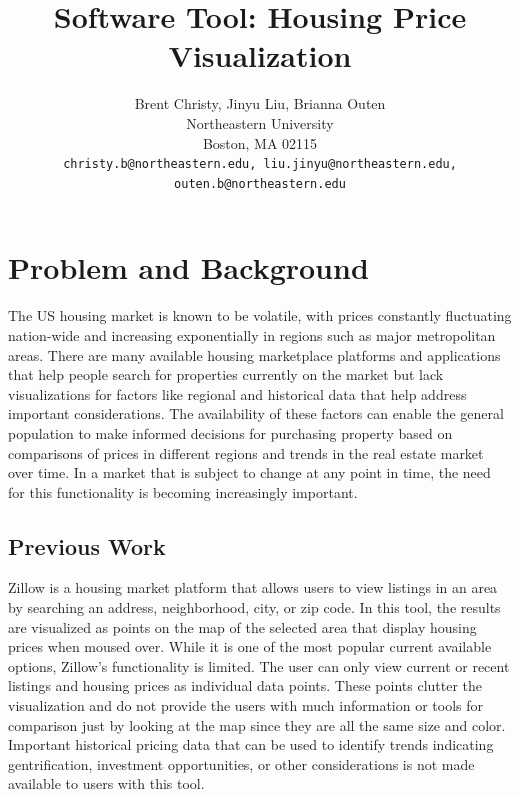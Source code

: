 \documentclass{article}
\title{Software Tool: Housing Price Visualization}
\author{%
  Brent Christy, Jinyu Liu, Brianna Outen \\
  Northeastern University\\
  Boston, MA 02115 \\
  \texttt{christy.b@northeastern.edu, liu.jinyu@northeastern.edu,} \\
  \texttt{outen.b@northeastern.edu} \\
}
\begin{document}
\maketitle

\section{Problem and Background}
The US housing market is known to be volatile, with prices constantly fluctuating nation-wide and increasing exponentially in regions such as major metropolitan
areas. There are many available housing marketplace platforms and applications that help people search for properties currently on the market but lack
visualizations for factors like regional and historical data that help address important considerations. The availability of these factors can enable the general
population to make informed decisions for purchasing property based on comparisons of prices in different regions and trends in the real estate market over time. In a market that is subject to change at any point in time, the need for this functionality is becoming increasingly important. 

\subsection{Previous Work}
Zillow is a housing market platform that allows users to view listings in an area by searching an address, neighborhood, city, or zip code. In this tool, the
results are visualized as points on the map of the selected area that display housing prices when moused over. While it is one of the most popular current
available options, Zillow’s functionality is limited. The user can only view current or recent listings and housing prices as individual data points. These points
clutter the visualization and do not provide the users with much information or tools for comparison just by looking at the map since they are all the same size
and color. Important historical pricing data that can be used to identify trends indicating gentrification, investment opportunities, or other considerations is not made available to users with this tool.
\end{document}
